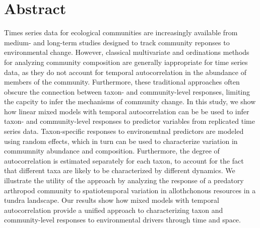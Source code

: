
\section*{Abstract}

Times series data for ecological communities are increasingly available
from medium- and long-term studies designed to track community reponses
to environmental change. However, classical multivariate and ordinations methods for
analyzing community composition are generally iappropriate for time series data,
as they do not account for temporal autocorrelation
in the abundance of members of the community.
Furthermore, these traditional approaches often obscure the connection between
taxon- and community-level responses, limiting the capcity to
infer the mechanisms of community change.
In this study, we show how linear mixed models with temporal autocorrelation
can be be used to infer taxon- and community-level responses
to predictor variables from replicated time series data.
Taxon-specific responses to environemtnal predictors are modeled
using random effects, which in turn can be used to characterize
variation in commumnity abundance and composition.
Furthermore, the degree of autocorrelation is
estimated separately for each taxon,
to account for the fact that different taxa are likely to be characterized by
different dynamics. We illustrate the utility of the approach
by analyzing the response of a predatory arthropod community to
spatiotemporal variation in allothchonous resources in a tundra landscape.
Our results show how mixed models with temporal autocorrelation provide
a unified approach to characterizing taxon and community-level
responses to environmental drivers through time and space.
